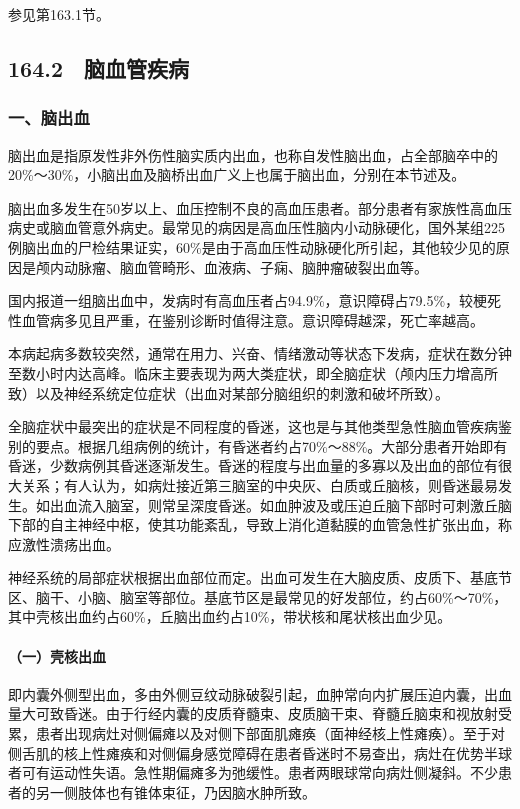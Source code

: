 参见第163.1节。

\protect\hypertarget{text00376.html}{}{}

\subsection{164.2　脑血管疾病}

\subsubsection{一、脑出血}

脑出血是指原发性非外伤性脑实质内出血，也称自发性脑出血，占全部脑卒中的20\%～30\%，小脑出血及脑桥出血广义上也属于脑出血，分别在本节述及。

脑出血多发生在50岁以上、血压控制不良的高血压患者。部分患者有家族性高血压病史或脑血管意外病史。最常见的病因是高血压性脑内小动脉硬化，国外某组225例脑出血的尸检结果证实，60\%是由于高血压性动脉硬化所引起，其他较少见的原因是颅内动脉瘤、脑血管畸形、血液病、子痫、脑肿瘤破裂出血等。

国内报道一组脑出血中，发病时有高血压者占94.9\%，意识障碍占79.5\%，较梗死性血管病多见且严重，在鉴别诊断时值得注意。意识障碍越深，死亡率越高。

本病起病多数较突然，通常在用力、兴奋、情绪激动等状态下发病，症状在数分钟至数小时内达高峰。临床主要表现为两大类症状，即全脑症状（颅内压力增高所致）以及神经系统定位症状（出血对某部分脑组织的刺激和破坏所致）。

全脑症状中最突出的症状是不同程度的昏迷，这也是与其他类型急性脑血管疾病鉴别的要点。根据几组病例的统计，有昏迷者约占70\%～88\%。大部分患者开始即有昏迷，少数病例其昏迷逐渐发生。昏迷的程度与出血量的多寡以及出血的部位有很大关系；有人认为，如病灶接近第三脑室的中央灰、白质或丘脑核，则昏迷最易发生。如出血流入脑室，则常呈深度昏迷。如血肿波及或压迫丘脑下部时可刺激丘脑下部的自主神经中枢，使其功能紊乱，导致上消化道黏膜的血管急性扩张出血，称应激性溃疡出血。

神经系统的局部症状根据出血部位而定。出血可发生在大脑皮质、皮质下、基底节区、脑干、小脑、脑室等部位。基底节区是最常见的好发部位，约占60\%～70\%，其中壳核出血约占60\%，丘脑出血约占10\%，带状核和尾状核出血少见。

\paragraph{（一）壳核出血}

即内囊外侧型出血，多由外侧豆纹动脉破裂引起，血肿常向内扩展压迫内囊，出血量大可致昏迷。由于行经内囊的皮质脊髓束、皮质脑干束、脊髓丘脑束和视放射受累，患者出现病灶对侧偏瘫以及对侧下部面肌瘫痪（面神经核上性瘫痪）。至于对侧舌肌的核上性瘫痪和对侧偏身感觉障碍在患者昏迷时不易查出，病灶在优势半球者可有运动性失语。急性期偏瘫多为弛缓性。患者两眼球常向病灶侧凝斜。不少患者的另一侧肢体也有锥体束征，乃因脑水肿所致。

